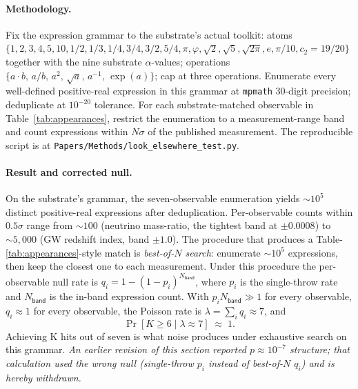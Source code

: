 \documentclass[11pt,a4paper]{amsart}
\theoremstyle{plain}
\theoremstyle{definition}
\begin{document}
\paragraph{Methodology.} Fix the expression grammar to the substrate's actual toolkit: atoms $\{1, 2, 3, 4, 5, 10, 1/2, 1/3, 1/4, 3/4, 3/2, 5/4, \pi, \varphi, \sqrt{2}, \sqrt{5}, \sqrt{2\pi}, e, \pi/10, c_2 = 19/20\}$ together with the nine substrate $\alpha$-values; operations $\{a\!\cdot\! b,\, a/b,\, a^2,\, \sqrt{a},\, a^{-1},\, \exp(a)\}$; cap at three operations. Enumerate every well-defined positive-real expression in this grammar at \texttt{mpmath} 30-digit precision; deduplicate at $10^{-20}$ tolerance. For each substrate-matched observable in Table~\ref{tab:appearances}, restrict the enumeration to a measurement-range band and count expressions within $N\sigma$ of the published measurement. The reproducible script is at \texttt{Papers/Methods/look\_elsewhere\_test.py}.

\paragraph{Result and corrected null.} On the substrate's grammar, the seven-observable enumeration yields $\sim 10^5$ distinct positive-real expressions after deduplication. Per-observable counts within $0.5\sigma$ range from $\sim 100$ (neutrino mass-ratio, the tightest band at $\pm 0.0008$) to $\sim 5{,}000$ (GW redshift index, band $\pm 1.0$). The procedure that produces a Table-\ref{tab:appearances}-style match is \emph{best-of-$N$ search}: enumerate $\sim 10^5$ expressions, then keep the closest one to each measurement. Under this procedure the per-observable null rate is $q_i = 1 - (1 - p_i)^{N_{\textsf{band}}}$, where $p_i$ is the single-throw rate and $N_{\textsf{band}}$ is the in-band expression count. With $p_i N_{\textsf{band}} \gg 1$ for every observable, $q_i \approx 1$ for every observable, the Poisson rate is $\lambda = \sum_i q_i \approx 7$, and
\[
\Pr[K \geq 6 \mid \lambda \approx 7] \;\approx\; 1.
\]
Achieving K hits out of seven is what noise produces under exhaustive search on this grammar. \emph{An earlier revision of this section reported $p \approx 10^{-7}$ structure; that calculation used the wrong null (single-throw $p_i$ instead of best-of-$N$ $q_i$) and is hereby withdrawn.}
\end{document}
